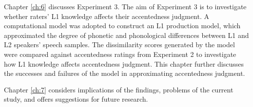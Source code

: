 Chapter \ref{ch:6} discusses Experiment 3. The aim of Experiment 3 is to investigate whether raters’ L1 knowledge affects their accentedness judgment. A computational model was adopted to construct an L1 production model, which approximated the degree of phonetic and phonological differences between L1 and L2 speakers' speech samples. The dissimilarity scores generated by the model were compared against accentedness ratings from Experiment 2 to investigate how L1 knowledge affects accentedness judgment. This chapter further discusses the successes and failures of the model in approximating accentedness judgment. 

Chapter \ref{ch:7} considers implications of the findings, problems of the current study, and offers suggestions for future research.


